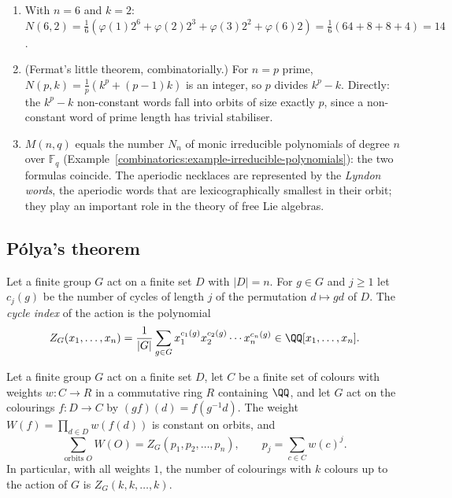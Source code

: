 \begin{example}\label{combinatorics:example-necklaces}
\begin{enumerate}
\item With $n = 6$ and $k = 2$: $N(6, 2) = \frac16(\varphi(1)2^6 + \varphi(2)2^3 + \varphi(3)2^2 + \varphi(6)2) = \frac16(64 + 8 + 8 + 4) = 14$.
\item (Fermat's little theorem, combinatorially.) For $n = p$ prime, $N(p, k) = \frac1p(k^p + (p - 1)k)$ is an integer, so $p$ divides $k^p - k$. Directly: the $k^p - k$ non-constant words fall into
orbits of size exactly $p$, since a non-constant word of prime length has trivial stabiliser.
\item $M(n, q)$ equals the number $N_n$ of monic irreducible polynomials of degree $n$ over $\mathbb{F}_q$ (Example~\ref{combinatorics:example-irreducible-polynomials}): the two formulas coincide. The
aperiodic necklaces are represented by the \emph{Lyndon words}, the aperiodic words that are lexicographically smallest in their orbit; they play an important role in the theory of free Lie algebras.
\end{enumerate}
\end{example}

\subsection{P\'olya's theorem}\label{combinatorics:subsection-polya}

\begin{definition}\label{combinatorics:definition-cycle-index}
Let a finite group $G$ act on a finite set $D$ with $|D| = n$. For $g \in G$ and $j \geq 1$ let $c_j(g)$ be the number of cycles of length $j$ of the permutation $d \mapsto gd$ of $D$. The
\emph{cycle index} of the action is the polynomial
\[
Z_G(x_1, \ldots, x_n) = \frac{1}{|G|}\sum_{g \in G}x_1^{c_1(g)}x_2^{c_2(g)} \cdots x_n^{c_n(g)} \in \QQ[x_1, \ldots, x_n].
\]
\end{definition}

\begin{theorem}[P\'olya]\label{combinatorics:theorem-polya}
Let a finite group $G$ act on a finite set $D$, let $C$ be a finite set of colours with weights $w \colon C \to R$ in a commutative ring $R$ containing $\QQ$, and let $G$ act on the colourings
$f \colon D \to C$ by $(gf)(d) = f(g^{-1}d)$. The weight $W(f) = \prod_{d \in D}w(f(d))$ is constant on orbits, and
\[
\sum_{\text{orbits } O}W(O) = Z_G(p_1, p_2, \ldots, p_n), \qquad p_j = \sum_{c \in C}w(c)^j .
\]
In particular, with all weights $1$, the number of colourings with $k$ colours up to the action of $G$ is $Z_G(k, k, \ldots, k)$.
\end{theorem}


